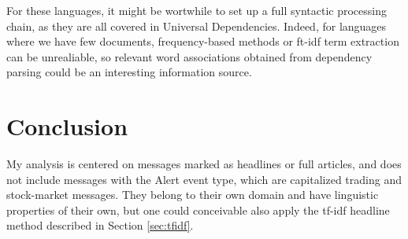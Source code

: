 \documentclass[12pt]{article}%
\begin{document}
For these languages, it might be wortwhile to set up a full syntactic processing chain, as they are all covered in Universal Dependencies. Indeed, for languages where we have few documents, frequency-based methods or ft-idf term extraction can be unrealiable, so relevant word associations obtained from dependency parsing could be an interesting information source.


\section{Conclusion}

My analysis is centered on messages marked as headlines or full articles, and does not include messages with the Alert event type, which are capitalized trading and stock-market messages. They belong to their own domain and have linguistic properties of their own, but one could conceivable also apply the tf-idf headline method described in Section \ref{sec:tfidf}.




%
\end{document}
